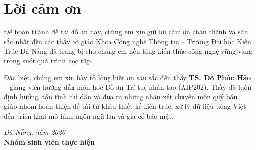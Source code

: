 \chapter*{Lời cảm ơn}

Để hoàn thành đề tài đồ án này, chúng em xin gửi lời cảm ơn chân thành và sâu sắc nhất đến các thầy cô giáo Khoa Công nghệ Thông tin – Trường Đại học Kiến Trúc Đà Nẵng đã trang bị cho chúng em nền tảng kiến thức công nghệ vững vàng trong suốt quá trình học tập.

Đặc biệt, chúng em xin bày tỏ lòng biết ơn sâu sắc đến thầy \textbf{TS. Đỗ Phúc Hảo} – giảng viên hướng dẫn môn học Đồ án Trí tuệ nhân tạo (AIP202). Thầy đã luôn định hướng, tận tình chỉ dẫn và đưa ra những nhận xét chuyên môn quý báu giúp nhóm hoàn thiện đề tài từ khâu thiết kế kiến trúc, xử lý dữ liệu tiếng Việt đến triển khai mô hình ngôn ngữ lớn và gia cố bảo mật.

\vspace{1.2cm}
\begin{flushright}
\textit{Đà Nẵng, năm 2026}\\
\textbf{Nhóm sinh viên thực hiện}
\end{flushright}
